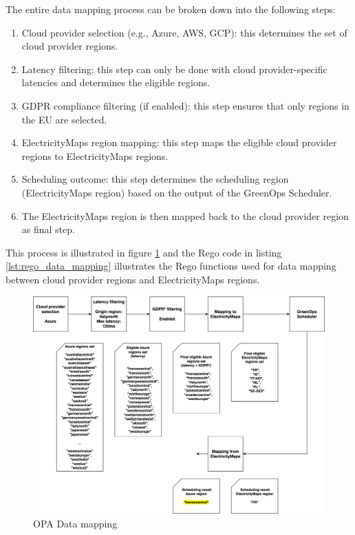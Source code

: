 The entire data mapping process can be broken down into the following steps:
\begin{enumerate}[itemsep=0.2pt, topsep=1pt]
  \item Cloud provider selection (e.g., Azure, AWS, GCP): this determines the set of cloud provider regions.
  \item Latency filtering: this step can only be done with cloud provider-specific latencies and determines the eligible regions.
  \item GDPR compliance filtering (if enabled): this step ensures that only regions in the EU are selected.
  \item ElectricityMaps region mapping: this step maps the eligible cloud provider regions to ElectricityMaps regions.
  \item Scheduling outcome: this step determines the scheduling region (ElectricityMaps region) based on the output of the GreenOps Scheduler.
  \item The ElectricityMaps region is then mapped back to the cloud provider region as final step. \newline
\end{enumerate}

This process is illustrated in figure \ref{fig:data_mapping} and the Rego code in listing \ref{lst:rego_data_mapping} illustrates the Rego functions used for data mapping between cloud provider regions and ElectricityMaps regions. \newline

\begin{figure}[htb]
  \centering
  \includegraphics[width=1\linewidth]{images/data_mapping.png}
  \caption{OPA Data mapping}
  \label{fig:data_mapping}
\end{figure}

